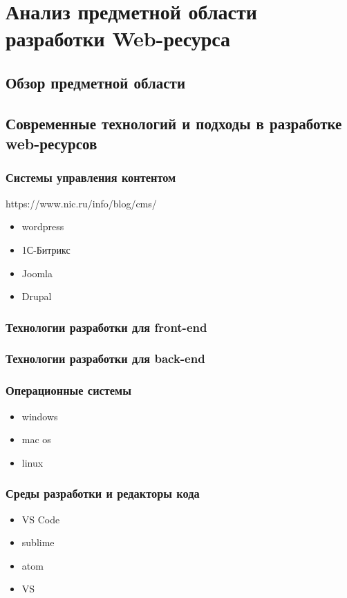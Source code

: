 \section{Анализ предметной области разработки Web-ресурса}
\subsection{Обзор предметной области}

\subsection{Современные технологий и подходы в разработке web-ресурсов}

    \subsubsection{Системы управления контентом}
        https://www.nic.ru/info/blog/cms/
        \begin{itemize}
            \item wordpress
            \item 1С-Битрикс
            \item Joomla
            \item Drupal
        \end{itemize}

    \subsubsection{Технологии разработки для front-end}
    \subsubsection{Технологии разработки для back-end}
    \subsubsection{Операционные системы}
        \begin{itemize}
            \item windows
            \item mac os
            \item linux
        \end{itemize}
        
    \subsubsection{Среды разработки и редакторы кода}
        \begin{itemize}
            \item VS Code
            \item sublime
            \item atom
            \item VS
        \end{itemize}

